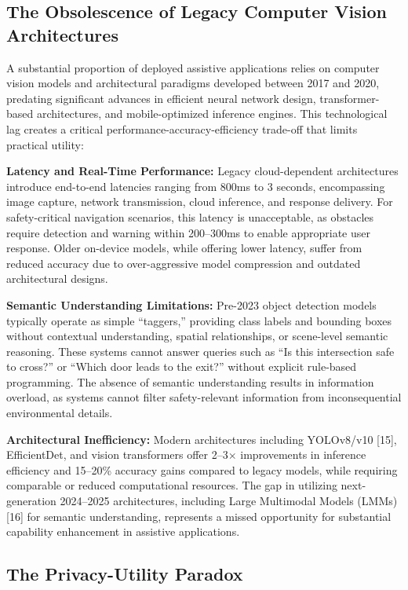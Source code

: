 \documentclass[a4paper]{report}
\begin{document}
\subsection{The Obsolescence of Legacy Computer Vision Architectures}

A substantial proportion of deployed assistive applications relies on computer vision models and architectural paradigms developed between 2017 and 2020, predating significant advances in efficient neural network design, transformer-based architectures, and mobile-optimized inference engines. This technological lag creates a critical performance-accuracy-efficiency trade-off that limits practical utility:

\textbf{Latency and Real-Time Performance:} Legacy cloud-dependent architectures introduce end-to-end latencies ranging from 800ms to 3 seconds, encompassing image capture, network transmission, cloud inference, and response delivery. For safety-critical navigation scenarios, this latency is unacceptable, as obstacles require detection and warning within 200--300ms to enable appropriate user response. Older on-device models, while offering lower latency, suffer from reduced accuracy due to over-aggressive model compression and outdated architectural designs.

\textbf{Semantic Understanding Limitations:} Pre-2023 object detection models typically operate as simple ``taggers,'' providing class labels and bounding boxes without contextual understanding, spatial relationships, or scene-level semantic reasoning. These systems cannot answer queries such as ``Is this intersection safe to cross?'' or ``Which door leads to the exit?'' without explicit rule-based programming. The absence of semantic understanding results in information overload, as systems cannot filter safety-relevant information from inconsequential environmental details.

\textbf{Architectural Inefficiency:} Modern architectures including YOLOv8/v10 [15], EfficientDet, and vision transformers offer 2--3$\times$ improvements in inference efficiency and 15--20\% accuracy gains compared to legacy models, while requiring comparable or reduced computational resources. The gap in utilizing next-generation 2024--2025 architectures, including Large Multimodal Models (LMMs) [16] for semantic understanding, represents a missed opportunity for substantial capability enhancement in assistive applications.

\subsection{The Privacy-Utility Paradox}
\end{document}
